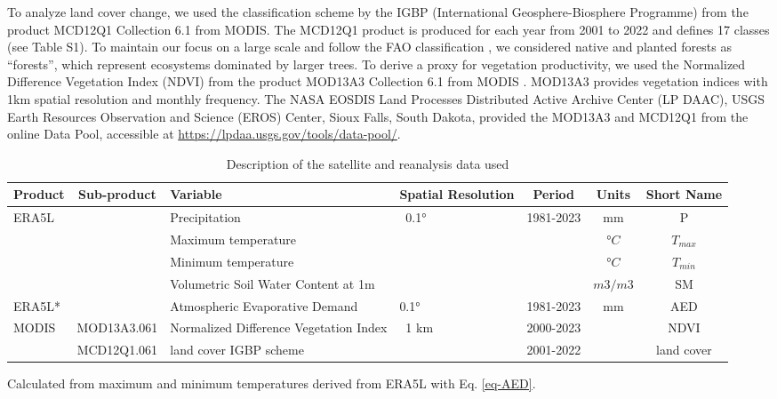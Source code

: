 \documentclass[
  authoryear,
  preprint,
  3p,
  onecolumn]{elsarticle}
\begin{document}
To analyze land cover change, we used the classification scheme by the
IGBP (International Geosphere-Biosphere Programme) from the product
MCD12Q1 Collection 6.1 from MODIS. The MCD12Q1 product is produced for
each year from 2001 to 2022 and defines 17 classes (see Table S1). To
maintain our focus on a large scale and follow the FAO classification
\citep{FAO2022}, we considered native and planted forests as
``forests'', which represent ecosystems dominated by larger trees. To
derive a proxy for vegetation productivity, we used the Normalized
Difference Vegetation Index (NDVI) from the product MOD13A3 Collection
6.1 from MODIS \citep{Didan2015}. MOD13A3 provides vegetation indices
with 1km spatial resolution and monthly frequency. The NASA EOSDIS Land
Processes Distributed Active Archive Center (LP DAAC), USGS Earth
Resources Observation and Science (EROS) Center, Sioux Falls, South
Dakota, provided the MOD13A3 and MCD12Q1 from the online Data Pool,
accessible at \url{https://lpdaa.usgs.gov/tools/data-pool/}.

\begin{table}[!ht]
\caption{Description of the satellite and reanalysis data used}
\label{tab-desEOD}
\scriptsize
\centering
\begin{tabular}{p{}cp{}p{}ccc}
\hline
\multirow{1}{*}{\centering Product} & Sub-product & Variable & Spatial Resolution  & Period & Units & Short Name \\ 
\hline
\multirow{4}{*}{ERA5L} & ~ & Precipitation & \multirow{4}{*}{~0.1°} & \multirow{4}{*}{1981-2023} & mm & P \\ 
         &  & Maximum temperature & ~ & & $°C$ & $T_{max}$ \\ 
         &  & Minimum temperature & ~ & & $°C$ & $T_{min}$ \\ 
         &  & Volumetric Soil Water Content at 1m & ~ & & $m3/m3$ & SM \\ 
ERA5L* & & Atmospheric Evaporative Demand & 0.1° & 1981-2023 & mm & AED \\
        \multirow{2}{*}{MODIS} & MOD13A3.061 & Normalized Difference Vegetation Index & \multirow{2}{*}{~1 km} & 2000-2023 & ~ & NDVI \\ 
         & MCD12Q1.061 & land cover IGBP scheme & & 2001-2022 & ~ & land cover \\ 
\hline
\end{tabular}
{\raggedright *Calculated from maximum and minimum temperatures derived from ERA5L with Eq. \ref{eq-AED}. \par}
\end{table}
\end{document}
